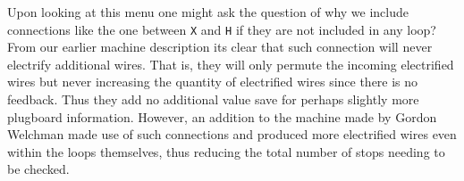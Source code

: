 \noindent Upon looking at this menu one might ask the question of why
we include connections like the one between \texttt{X} and \texttt{H}
if they are not included in any loop? From our earlier machine
description its clear that such connection will never electrify
additional wires. That is, they will only permute the incoming
electrified wires but never increasing the quantity of electrified
wires since there is no feedback. Thus they add no additional value
save for perhaps slightly more plugboard information. However, an
addition to the machine made by Gordon Welchman made use of such
connections and produced more electrified wires even within the loops
themselves, thus reducing the total number of stops needing to be checked.

